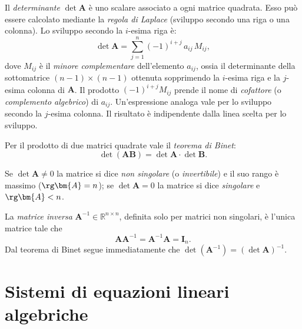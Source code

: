 Il \textit{determinante} $\det\bm{A}$ \`e uno scalare associato a ogni matrice
quadrata. Esso pu\`o essere calcolato mediante la \textit{regola di Laplace}
(sviluppo secondo una riga o una colonna). Lo sviluppo secondo la $i$-esima
riga \`e:
\begin{equation}\label{eq:laplace}
	\det\bm{A} = \sum_{j=1}^{n} (-1)^{i+j}\, a_{ij}\, M_{ij},
\end{equation}
dove $M_{ij}$ \`e il \textit{minore complementare} dell'elemento $a_{ij}$,
ossia il determinante della sottomatrice $(n{-}1)\times(n{-}1)$ ottenuta
sopprimendo la $i$-esima riga e la $j$-esima colonna di $\bm{A}$. Il prodotto
$(-1)^{i+j} M_{ij}$ prende il nome di \textit{cofattore} (o \textit{complemento
	algebrico}) di $a_{ij}$. Un'espressione analoga vale per lo sviluppo secondo
la $j$-esima colonna. Il risultato \`e indipendente dalla linea scelta per lo
sviluppo.

Per il prodotto di due matrici quadrate vale il \textit{teorema di Binet}:
\begin{equation}\label{eq:binet}
	\det(\bm{A}\bm{B}) = \det\bm{A}\cdot\det\bm{B}.
\end{equation}

Se $\det\bm{A} \neq 0$ la matrice si dice \textit{non singolare}
(o \textit{invertibile}) e il suo rango \`e massimo ($\rg\bm{A}=n$);
se $\det\bm{A} = 0$ la matrice si dice \textit{singolare} e $\rg\bm{A}<n$.

La \textit{matrice inversa} $\bm{A}^{-1} \in \mathbb{R}^{n \times n}$,
definita solo per matrici non singolari, \`e l'unica matrice tale che
\begin{equation}
	\bm{A}\bm{A}^{-1} = \bm{A}^{-1}\bm{A} = \bm{I}_n.
\end{equation}
Dal teorema di Binet segue immediatamente che
$\det(\bm{A}^{-1}) = (\det\bm{A})^{-1}$.



\section{Sistemi di equazioni lineari algebriche}\label{sec:sistemi_lineari}


